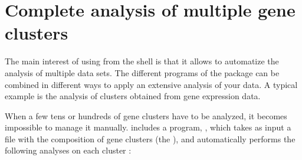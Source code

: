 \section{Complete analysis of multiple gene clusters}

The main interest of using \RSAT from the shell is that it allows to
automatize the analysis of multiple data sets. The different programs
of the package can be combined in different ways to apply an extensive
analysis of your data. A typical example is the analysis of clusters
obtained from gene expression data.

When a few tens or hundreds of gene clusters have to be analyzed, it
becomes impossible to manage it manually. \RSAT includes a program,
, which takes as input a file with
the composition of gene clusters (the ), and
automatically performs the following analyses on each cluster :

